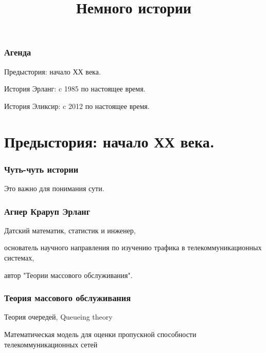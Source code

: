 \documentclass[10pt]{beamer}
\title{Немного истории}
\begin{document}
\maketitle

\begin{frame}
\frametitle{Агенда}
\centering
Предыстория: начало ХХ века.
\par \bigskip
История Эрланг: c 1985 по настоящее время.
\par \bigskip
История Эликсир: c 2012 по настоящее время.
\end{frame}


\section{Предыстория: начало ХХ века.}

{
\begin{frame}
\frametitle{Чуть-чуть истории}
\centering
Это важно для понимания сути.
\end{frame}
}

\begin{frame}
\frametitle{Агнер Краруп Эрланг}
\centering
Датский математик, статистик и инженер,
\par \bigskip
основатель научного направления по изучению трафика в телекоммуникационных системах,
\par \bigskip
автор "Теории массового обслуживания".
\end{frame}

\begin{frame}
\frametitle{Теория массового обслуживания}
\par \bigskip
Теория очередей, Queueing theory
\par \bigskip
Математическая модель для оценки пропускной способности телекоммуникационных сетей
\end{frame}
\end{document}
